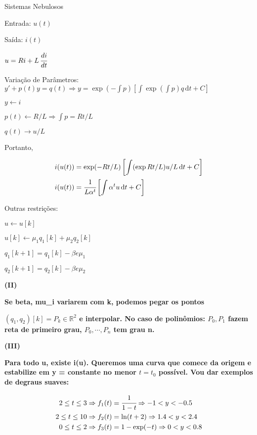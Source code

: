 \documentclass[12pt]{article}
\begin{document}
\Large

\begin{center}
Sistemas Nebulosos
\end{center}

\normalsize

\vspace{3mm}

Entrada: $u(t)$

Sa\'ida: $i(t)$

$u = Ri + L\, \cfrac{di}{dt}$

Varia\c{c}\~ao de Par\^ametros: $y' + p(t) y = q(t) \Rightarrow y = \exp(-\int p) \left[ \int \exp (\int p) q \,\mathrm{d}t + C \right]$

$y \leftarrow i$

$p(t) \leftarrow R/L \Rightarrow \int p = Rt/L$

$q(t) \rightarrow u/L$

Portanto,

\begin{align}
 i(u(t)) &= \exp(-Rt/L) \left[ \int (\exp Rt/L) u/L \,\mathrm{d}t + C \right] \\
 i(u(t)) &= \cfrac{1}{L \alpha^t} \left[ \int \alpha^t u \,\mathrm{d}t + C \right]
\end{align}

Outras restri\c{c}\~oes:

$u \leftarrow u[k]$

$u[k] \leftarrow \mu_1 q_1[k] + \mu_2 q_2[k]$

$q_1[k+1] = q_1[k] - \beta e \mu_1$

$q_2[k+1] = q_2[k] - \beta e \mu_2$

\vspace{3mm}

\textbf{(II)}

\textbf{Se beta, mu\_i variarem com k, podemos pegar os pontos}

\textbf{$(q_1, q_2)[k] = P_k \in \mathbb{R}^2$ e interpolar. No caso de polin\^omios: $P_0, P_1$ fazem reta de primeiro grau, $P_0, \cdots, P_n$ tem grau n.}

\vspace{3mm}

\textbf{(III)}

\textbf{Para todo u, existe i(u). Queremos uma curva que comece da origem e estabilize em y = constante no menor $t = t_0$ poss\'ivel. Vou dar exemplos de degraus suaves:}

\begin{align}
  2 \le t \le 3 \Rightarrow f_1(t) &= \cfrac{1}{1 - t} \Rightarrow -1 < y < -0.5 \\
  2 \le t \le 10 \Rightarrow f_2(t) &= \ln(t + 2) \Rightarrow 1.4 < y < 2.4 \\
  0 \le t \le 2 \Rightarrow f_3(t) &= 1 - \exp(-t) \Rightarrow 0 < y < 0.8
\end{align}
\end{document}
